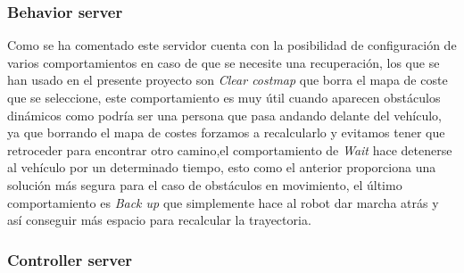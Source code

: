 \subsubsection{Behavior server}
Como se ha comentado este servidor cuenta con la posibilidad de configuración de varios comportamientos en caso de que se necesite una recuperación, 
los que se han usado en el presente proyecto son \textit{Clear costmap} que borra el mapa de coste que se seleccione, este comportamiento es 
muy útil cuando aparecen obstáculos dinámicos como podría ser una persona que pasa andando delante del vehículo, ya que borrando el mapa 
de costes forzamos a recalcularlo y evitamos tener que retroceder para encontrar otro camino,el comportamiento de \textit{Wait} hace detenerse al vehículo 
por un determinado tiempo, esto como el anterior proporciona una solución más segura para el caso de obstáculos en movimiento, el último comportamiento 
es \textit{Back up} que simplemente hace al robot dar marcha atrás y así conseguir más espacio para recalcular la trayectoria.

\subsubsection{Controller server}



